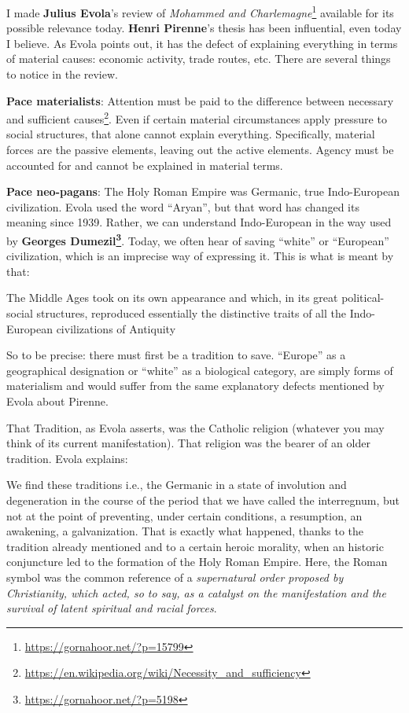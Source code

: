 I made \textbf{Julius Evola}'s review of \emph{Mohammed and Charlemagne}\footnote{\url{https://gornahoor.net/?p=15799}} available for its possible relevance today. \textbf{Henri Pirenne}'s thesis has been influential, even today I believe. As Evola points out, it has the defect of explaining everything in terms of material causes: economic activity, trade routes, etc. There are several things to notice in the review.

\textbf{Pace materialists}: Attention must be paid to the difference between necessary and sufficient causes\footnote{\url{https://en.wikipedia.org/wiki/Necessity_and_sufficiency}}. Even if certain material circumstances apply pressure to social structures, that alone cannot explain everything. Specifically, material forces are the passive elements, leaving out the active elements. Agency must be accounted for and cannot be explained in material terms.

\textbf{Pace neo-pagans}: The Holy Roman Empire was Germanic, true Indo-European civilization. Evola used the word ``Aryan'', but that word has changed its meaning since 1939. Rather, we can understand Indo-European in the way used by \textbf{Georges Dumezil\footnote{\url{https://gornahoor.net/?p=5198}}}. Today, we often hear of saving ``white'' or ``European'' civilization, which is an imprecise way of expressing it. This is what is meant by that:

\begin{quotex}
The Middle Ages took on its own appearance and which, in its great political-social structures, reproduced essentially the distinctive traits of all the Indo-European civilizations of Antiquity
\end{quotex}


So to be precise: there must first be a tradition to save. ``Europe'' as a geographical designation or ``white'' as a biological category, are simply forms of materialism and would suffer from the same explanatory defects mentioned by Evola about Pirenne.

That Tradition, as Evola asserts, was the Catholic religion (whatever you may think of its current manifestation). That religion was the bearer of an older tradition. Evola explains:

\begin{quotex}
We find these traditions i.e., the Germanic in a state of involution and degeneration in the course of the period that we have called the interregnum, but not at the point of preventing, under certain conditions, a resumption, an awakening, a galvanization. That is exactly what happened, thanks to the tradition already mentioned and to a certain heroic morality, when an historic conjuncture led to the formation of the Holy Roman Empire. Here, the Roman symbol was the common reference of a \emph{supernatural order proposed by Christianity, which acted, so to say, as a catalyst on the manifestation and the survival of latent spiritual and racial forces}.
\end{quotex}


